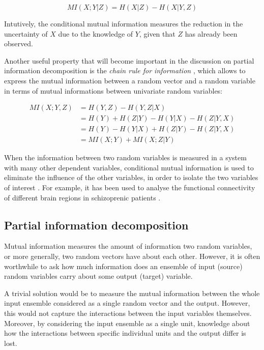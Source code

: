 \documentclass[12pt]{article}
\begin{document}
\begin{equation}
MI(X;Y|Z) = H(X|Z) - H(X|Y,Z)
\end{equation}

Intutively, the conditional mutual information measures the reduction in the uncertainty of $X$ due to the knowledge of $Y$, given that $Z$ has already been observed. 

Another useful property that will become important in the discussion on partial information decomposition is the \textit{chain rule for information} \cite{cover-thomas}, which allows to express the mutual information between a random vector and a random variable in terms of mutual informations between univariate random variables:

\begin{equation}
\begin{split}
MI(X;Y,Z) & = H(Y,Z) - H(Y,Z|X) \\ 
		  & = H(Y) + H(Z|Y) - H(Y|X) - H(Z|Y,X) \\ 
		  & = H(Y) - H(Y|X) + H(Z|Y) - H(Z|Y,X) \\ 
		  & = MI(X;Y) + MI(X;Z|Y)
\label{eq:chain-rule-inf}
\end{split}
\end{equation}

When the information between two random variables is measured in a system with many other dependent variables, conditional mutual information is used to eliminate the influence of the other variables, in order to isolate the two variables of interest \cite{williams-beer}. For example, it has been used to analyse the functional connectivity of different brain regions in schizoprenic patients \cite{brain-cond-inf}.

\newpage
\subsection{Partial information decomposition}

Mutual information measures the amount of information two random variables, or more generally, two random vectors have about each other. However, it is often worthwhile to ask how much information does an ensemble of input (source) random variables carry about some output (target) variable. 

A trivial solution would be to measure the mutual information between the whole input ensemble considered as a single random vector and the output. However, this would not capture the interactions between the input variables themselves. Moreover, by considering the input ensemble as a single unit, knowledge about how the interactions between specific individual units and the output differ is lost. 
\end{document}
